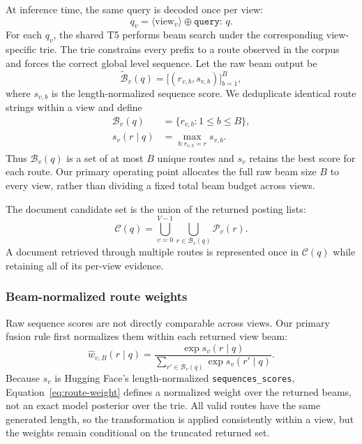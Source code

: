 At inference time, the same query is decoded once per view:
\begin{equation}
    q_v=\langle\mathrm{view}_v\rangle\oplus\texttt{query: }q.
\end{equation}
For each $q_v$, the shared T5 performs beam search under the corresponding view-specific trie. The trie constrains every prefix to a route observed in the corpus and forces the correct global level sequence. Let the raw beam output be
\begin{equation}
    \widetilde{\mathcal{B}}_v(q)
    =\bigl[(r_{v,b},s_{v,b})\bigr]_{b=1}^{B},
\end{equation}
where $s_{v,b}$ is the length-normalized sequence score. We deduplicate identical route strings within a view and define
\begin{align}
    \mathcal{B}_v(q)
    &=\{r_{v,b}:1\leq b\leq B\},\\
    s_v(r\mid q)
    &=\max_{b:r_{v,b}=r}s_{v,b}.
\end{align}
Thus $\mathcal{B}_v(q)$ is a set of at most $B$ unique routes and $s_v$ retains the best score for each route. Our primary operating point allocates the full raw beam size $B$ to every view, rather than dividing a fixed total beam budget across views.

The document candidate set is the union of the returned posting lists:
\begin{equation}
\label{eq:candidate-union}
    \mathcal{C}(q)
    =\bigcup_{v=0}^{V-1}
      \bigcup_{r\in\mathcal{B}_v(q)}
      \mathcal{P}_v(r).
\end{equation}
A document retrieved through multiple routes is represented once in $\mathcal{C}(q)$ while retaining all of its per-view evidence.

\subsubsection{Beam-normalized route weights}

Raw sequence scores are not directly comparable across views. Our primary fusion rule first normalizes them within each returned view beam:
\begin{equation}
\label{eq:route-weight}
    \widehat{w}_{v,B}(r\mid q)
    =
    \frac{\exp s_v(r\mid q)}
         {\sum_{r'\in\mathcal{B}_v(q)}
          \exp s_v(r'\mid q)}.
\end{equation}
Because $s_v$ is Hugging Face's length-normalized \texttt{sequences\_scores}, Equation~\ref{eq:route-weight} defines a normalized weight over the returned beams, not an exact model posterior over the trie. All valid routes have the same generated length, so the transformation is applied consistently within a view, but the weights remain conditional on the truncated returned set.

